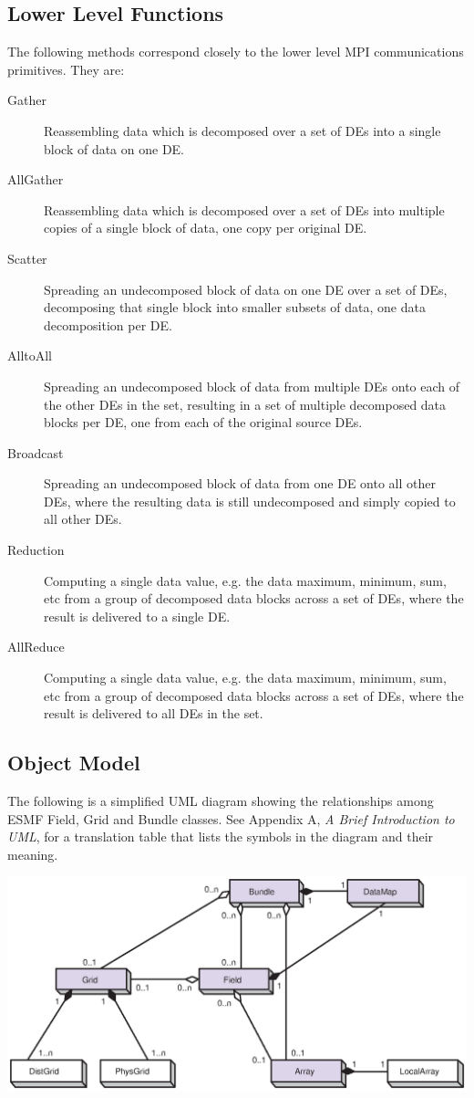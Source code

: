 \subsection{Lower Level Functions}
The following methods correspond closely to the lower level
MPI communications primitives.  They are:
\begin{description}
\item[Gather]
Reassembling data which is decomposed over a set of DEs into a single
block of data on one DE.
\item[AllGather]
Reassembling data which is decomposed over a set of DEs into multiple
copies of a single block of data, one copy per original DE.
\item[Scatter]
Spreading an undecomposed block of data on one DE over a set of DEs,
decomposing that single block into smaller subsets of data, one
data decomposition per DE.
\item[AlltoAll]
Spreading an undecomposed block of data from multiple DEs onto
each of the other DEs in the set, resulting in a set of multiple decomposed 
data blocks per DE, one from each of the original source DEs.
\item[Broadcast]
Spreading an undecomposed block of data from one DE onto all other
DEs, where the resulting data is still undecomposed and simply
copied to all other DEs.
\item[Reduction]
Computing a single data value, e.g. the data maximum, minimum, sum, etc
from a group of decomposed data blocks across a set of DEs, where the
result is delivered to a single DE.
\item[AllReduce]
Computing a single data value, e.g. the data maximum, minimum, sum, etc
from a group of decomposed data blocks across a set of DEs, where the
result is delivered to all DEs in the set.
\end{description}

\newpage
\subsection{Object Model}

The following is a simplified UML diagram showing the relationships among
ESMF Field, Grid and Bundle classes.  See Appendix A, {\it A Brief 
Introduction to UML},
for a translation table that lists the symbols in the diagram and their 
meaning.

\begin{center}
\includegraphics{Bundle_obj.eps}   
\end{center}










